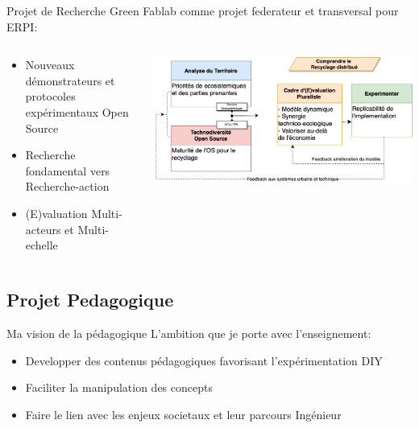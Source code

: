 \documentclass[
  11pt,
  ignorenonframetext,
  aspectratio=169,
  c]{beamer}
\begin{document}
\begin{frame}{Projet de Recherche}
Green Fablab comme projet federateur et transversal pour ERPI:

\begin{columns}[T]
\begin{column}[T]{0.3\textwidth}
\footnotesize

\begin{itemize}
\item
  Nouveaux démonstrateurs et protocoles expérimentaux Open Source
\item
  Recherche fondamental vers Recherche-action
\item
  (E)valuation Multi-acteurs et Multi-echelle
\end{itemize}
\end{column}

\begin{column}[T]{0.7\textwidth}
\includegraphics{Figures/slides/Projet-Recherche.jpg}
\end{column}
\end{columns}
\end{frame}

\hypertarget{projet-pedagogique}{%
\subsection{Projet Pedagogique}\label{projet-pedagogique}}

\begin{frame}{Ma vision de la pédagogique}
\protect\hypertarget{ma-vision-de-la-puxe9dagogique}{}
L'ambition que je porte avec l'enseignement:

\begin{itemize}
\item
  Developper des contenus pédagogiques favorisant l'expérimentation DIY
\item
  Faciliter la manipulation des concepts
\item
  Faire le lien avec les enjeux societaux et leur parcours Ingénieur
\end{itemize}
\end{frame}
\end{document}
